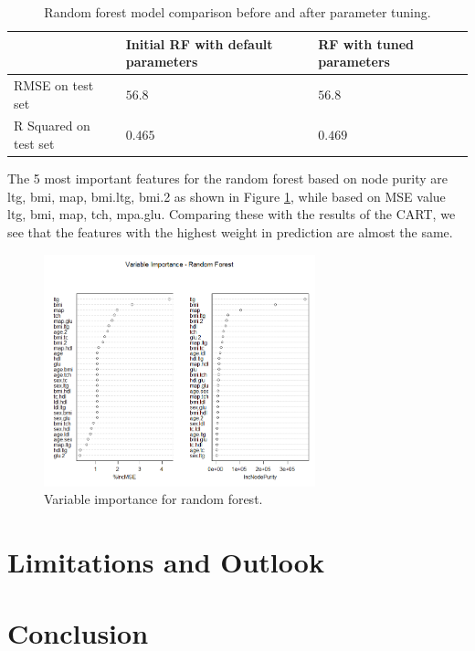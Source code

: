 \documentclass{usiinftr}
\begin{document}
\begin{table}
\centering \label{RFtuned} \caption{Random forest model comparison before and after parameter tuning.}
\begin{tabular}{|l|l|l|}
\hline & Initial RF with default parameters & RF with tuned parameters \\
\hline RMSE on test set & $56.8$ & $56.8$ \\
\hline R Squared on test set & $0.465$ & $0.469$ \\
\hline
\end{tabular}
\end{table}

The 5 most important features for the random forest based on node purity are ltg, bmi, map, bmi.ltg, bmi.2 as shown in Figure \ref{RFImp}, while based on MSE value ltg, bmi, map, tch, mpa.glu. Comparing these with the results of the CART, we see that the features with the highest weight in prediction are almost the same. 

\begin{figure}[h!] 
\centering
\includegraphics[width=0.7\textwidth]{images/image115.png}
\caption{Variable importance for random forest.}
\label{RFImp}
\end{figure}
\section{Limitations and Outlook}


\section{Conclusion}





\end{document}
